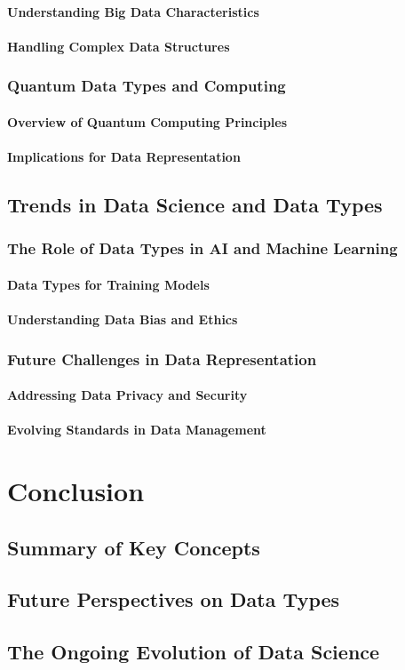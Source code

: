\documentclass[12pt, oneside]{book}
\begin{document}
\subsubsection{Understanding Big Data Characteristics}
\subsubsection{Handling Complex Data Structures}
\subsection{Quantum Data Types and Computing}
\subsubsection{Overview of Quantum Computing Principles}
\subsubsection{Implications for Data Representation}
\section{Trends in Data Science and Data Types}
\subsection{The Role of Data Types in AI and Machine Learning}
\subsubsection{Data Types for Training Models}
\subsubsection{Understanding Data Bias and Ethics}
\subsection{Future Challenges in Data Representation}
\subsubsection{Addressing Data Privacy and Security}
\subsubsection{Evolving Standards in Data Management}

\chapter{Conclusion}
\section{Summary of Key Concepts}
\section{Future Perspectives on Data Types}
\section{The Ongoing Evolution of Data Science}
\end{document}
